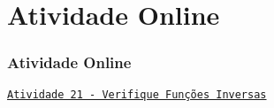 \section{Atividade Online}
\begin{frame}
\frametitle{Atividade Online} 

\href{https://pt.khanacademy.org/math/algebra2/manipulating-functions/verifying-that-functions-are-inverses/e/inverses_of_functions}
{{\tt Atividade 21 - Verifique Funções Inversas}}



\end{frame}